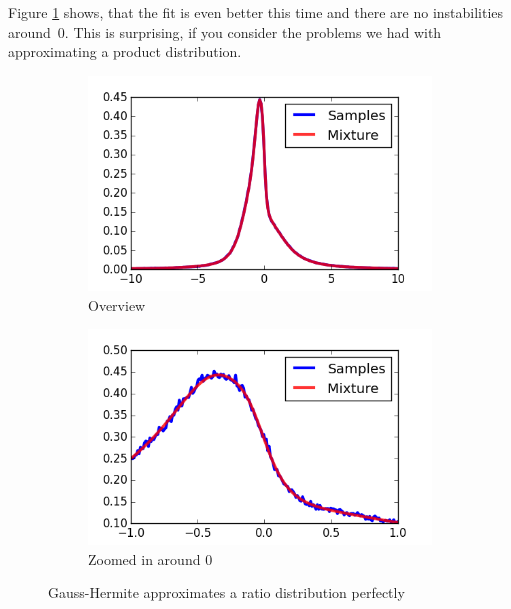 \documentclass[11pt,a4paper]{book}
\begin{document}
Figure \ref{fig:hermite-division} shows, that the fit is even better this time
and there are no instabilities around~$0$. This is surprising, if you consider
the problems we had with approximating a product distribution.
\begin{figure}[h]
  \centering
  \begin{subfigure}{0.45\textwidth}
    \centering
    \includegraphics[width=\textwidth]{thesis/theory/division}
    \caption{Overview}
  \end{subfigure}
  \hfill
  \begin{subfigure}{0.45\textwidth}
    \centering
    \includegraphics[width=\textwidth]{thesis/theory/division-zoomed}
    \caption{Zoomed in around $0$}
  \end{subfigure}
  \caption{Gauss-Hermite approximates a ratio distribution perfectly}
  \label{fig:hermite-division}
\end{figure}
\end{document}
